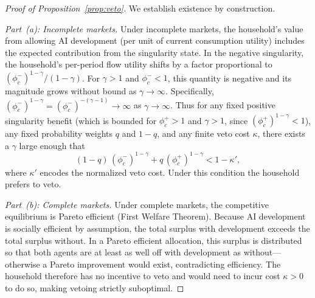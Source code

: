 \documentclass[12pt]{article}
\begin{document}
\begin{proof}[Proof of Proposition~\ref{prop:veto}]
We establish existence by construction.

\textit{Part~(a): Incomplete markets.}
Under incomplete markets, the household's value from allowing AI development (per unit of current consumption utility) includes the expected contribution from the singularity state.
In the negative singularity, the household's per-period flow utility shifts by a factor proportional to $(\phi_c^-)^{1-\gamma}/(1-\gamma)$.
For $\gamma > 1$ and $\phi_c^- < 1$, this quantity is negative and its magnitude grows without bound as $\gamma \to \infty$.
Specifically, $(\phi_c^-)^{1-\gamma} = (\phi_c^-)^{-(\gamma-1)} \to \infty$ as $\gamma \to \infty$.
Thus for any fixed positive singularity benefit (which is bounded for $\phi_c^+ > 1$ and $\gamma > 1$, since $(\phi_c^+)^{1-\gamma} < 1$), any fixed probability weights $q$ and $1-q$, and any finite veto cost $\kappa$, there exists a $\gamma$ large enough that
\begin{equation}
(1-q)\,(\phi_c^-)^{1-\gamma} + q\,(\phi_c^+)^{1-\gamma} < 1 - \kappa',
\label{eq:veto_condition} %
\end{equation}
where $\kappa'$ encodes the normalized veto cost.
Under this condition the household prefers to veto.

\textit{Part~(b): Complete markets.}
Under complete markets, the competitive equilibrium is Pareto efficient (First Welfare Theorem).
Because AI development is socially efficient by assumption, the total surplus with development exceeds the total surplus without.
In a Pareto efficient allocation, this surplus is distributed so that both agents are at least as well off with development as without---otherwise a Pareto improvement would exist, contradicting efficiency.
The household therefore has no incentive to veto and would need to incur cost $\kappa > 0$ to do so, making vetoing strictly suboptimal.
\end{proof}
\end{document}

